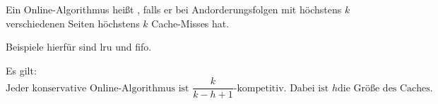 \begin{definition}
  Ein Online-Algorithmus heißt , falls er bei Andorderungsfolgen mit höchstens \( k \) verschiedenen Seiten höchstens \( k \) Cache-Misses hat.

  Beispiele hierfür sind lru und fifo.
\end{definition}

Es gilt:
\begin{equation*}
  \text{Jeder konservative Online-Algorithmus ist } \frac{k}{k-h+1} \text{-kompetitiv. Dabei ist } h \text{die Größe des Caches.}
\end{equation*}
%
%
%
%
%
%
%
%
%
%
